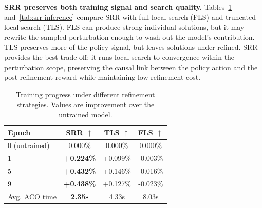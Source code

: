 \begin{table}[h]
\centering
\caption{Decoupling the two mechanisms of dynamic neural guidance. Values are gap (\%) to BKS on 16 instances at I$_{1000}$.}
\label{tab:ablation-decoupling}
\small
{}
\end{table}

\smallskip\noindent\textbf{SRR preserves both training signal and search quality.}
Tables~\ref{tab:srr-training} and~\ref{tab:srr-inference} compare SRR with full local search (FLS) and truncated local search (TLS). FLS can produce strong individual solutions, but it may rewrite the sampled perturbation enough to wash out the model's contribution. TLS preserves more of the policy signal, but leaves solutions under-refined. SRR provides the best trade-off: it runs local search to convergence within the perturbation scope, preserving the causal link between the policy action and the post-refinement reward while maintaining low refinement cost.

\begin{table}[h]
\centering
\caption{Training progress under different refinement strategies. Values are improvement over the untrained model.}
\label{tab:srr-training}
\small
\setlength{\tabcolsep}{0pt}
\renewcommand{\arraystretch}{0.80}
\begin{tabular*}{\columnwidth}{@{\extracolsep{\fill}}lccc@{}}
\toprule
Epoch & SRR $\uparrow$ & TLS $\uparrow$ & FLS $\uparrow$ \\
\midrule
0 (untrained) & 0.000\% & 0.000\% & 0.000\% \\
1 & \textbf{+0.224\%} & +0.099\% & -0.003\% \\
5 & \textbf{+0.432\%} & +0.146\% & -0.016\% \\
9 & \textbf{+0.438\%} & +0.127\% & -0.023\% \\
\midrule
Avg. ACO time & \textbf{2.35s} & 4.33s & 8.03s \\
\bottomrule
\end{tabular*}
\end{table}

